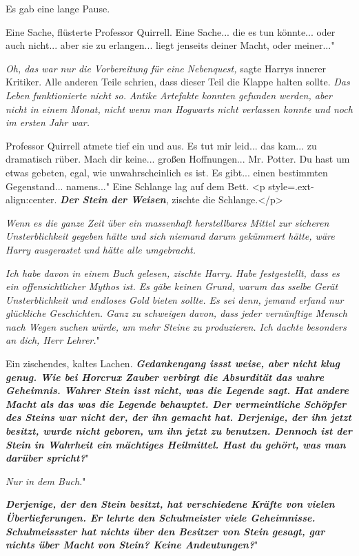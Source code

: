Es gab eine lange Pause.

\glqq{}Eine Sache\grqq{}, flüsterte Professor Quirrell. \glqq{}Eine Sache... die
es tun könnte... oder auch nicht... aber sie zu erlangen... liegt jenseits
deiner Macht, oder meiner..."

\emph{Oh, das war nur die Vorbereitung für eine Nebenquest,} sagte Harrys
innerer Kritiker. Alle anderen Teile schrien, dass dieser Teil die Klappe halten
sollte. \emph{Das Leben funktionierte nicht so.} \emph{Antike Artefakte konnten
gefunden werden, aber nicht in einem Monat, nicht wenn man Hogwarts nicht
verlassen konnte und noch im ersten Jahr war.}

Professor Quirrell atmete tief ein und aus. \glqq{}Es tut mir leid... das kam...
zu dramatisch rüber. Mach dir keine... großen Hoffnungen... Mr. Potter. Du hast
um etwas gebeten, egal, wie unwahrscheinlich es ist. Es gibt... einen bestimmten
Gegenstand... namens..." Eine Schlange lag auf dem Bett. <p
style=\grqq{}.ext-align:center\grqq{}. \glqq{}\textbf{\emph{Der Stein der
Weisen}}\grqq{}, zischte die Schlange.</p>

\emph{Wenn es die ganze Zeit über ein massenhaft herstellbares Mittel zur
sicheren Unsterblichkeit gegeben hätte und sich niemand darum gekümmert hätte,
wäre Harry ausgerastet und hätte alle umgebracht.}

\glqq{}\emph{Ich habe davon in einem Buch gelesen\grqq{}, zischte Harry. \glqq
Habe festgestellt, dass es ein offensichtlicher Mythos ist. Es gäbe keinen
Grund, warum das sselbe Gerät Unsterblichkeit und endloses Gold bieten sollte.
Es sei denn, jemand erfand nur glückliche Geschichten. Ganz zu schweigen davon,
dass jeder vernünftige Mensch nach Wegen suchen würde, um mehr Steine zu
produzieren. Ich dachte besonders an dich, Herr Lehrer.}"

Ein zischendes, kaltes Lachen. \glqq{}\textbf{\emph{Gedankengang issst weise,
aber nicht klug genug. Wie bei Horcrux Zauber verbirgt die Absurdität das wahre
Geheimnis. Wahrer Stein isst nicht, was die Legende sagt. Hat andere Macht als
das was die Legende behauptet. Der vermeintliche Schöpfer des Steins war nicht
der, der ihn gemacht hat. Derjenige, der ihn jetzt besitzt, wurde nicht geboren,
um ihn jetzt zu benutzen. Dennoch ist der Stein in Wahrheit ein mächtiges
Heilmittel. Hast du gehört, was man darüber spricht?}}"

\glqq{}\emph{Nur in dem Buch.}"

\glqq{}\textbf{\emph{Derjenige, der den Stein besitzt, hat verschiedene Kräfte
von vielen Überlieferungen. Er lehrte den Schulmeister viele Geheimnisse.
Schulmeissster hat nichts über den Besitzer von Stein gesagt, gar nichts über
Macht von Stein? Keine Andeutungen?}}"

